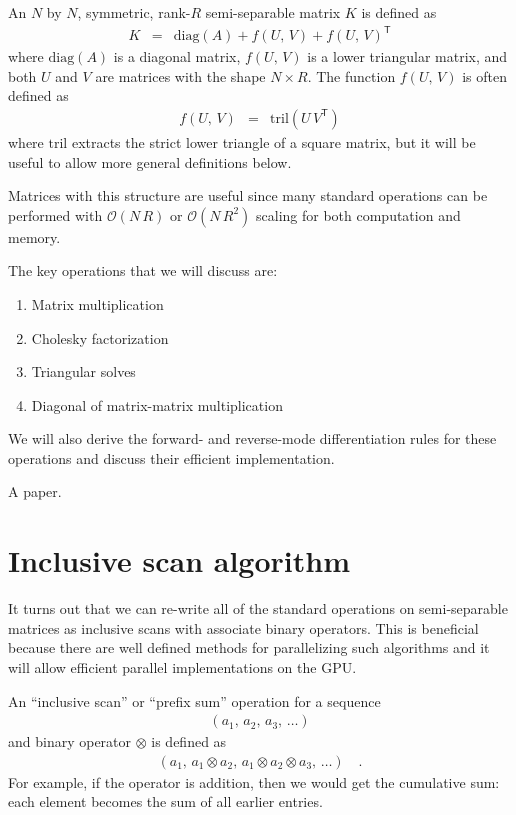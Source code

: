 \documentclass[10pt]{article}
\newcommand{\T}{^{\!\mathsf{T}\!}}
\begin{document}
An $N$ by $N$, symmetric, rank-$R$ semi-separable matrix $K$ is defined as
\begin{eqnarray}
  K &=& \mathrm{diag}(A) + f(U,\, V) + f(U,\, V)\T
\end{eqnarray}
where $\mathrm{diag}(A)$ is a diagonal matrix, $f(U,\, V)$ is a lower triangular matrix, and both $U$ and $V$ are matrices with the shape $N \times R$.
The function $f(U,\, V)$ is often defined as
\begin{eqnarray}
  f(U,\, V) &=& \mathrm{tril}(U \, V\T)
\end{eqnarray}
where $\mathrm{tril}$ extracts the strict lower triangle of a square matrix, but it will be useful to allow more general definitions below.

Matrices with this structure are useful since many standard operations can be performed with $\mathcal{O}(N\,R)$ or $\mathcal{O}(N\,R^2)$ scaling for both computation and memory.

The key operations that we will discuss are:

\begin{enumerate}
  \item Matrix multiplication
  \item Cholesky factorization
  \item Triangular solves
  \item Diagonal of matrix-matrix multiplication
\end{enumerate}

We will also derive the forward- and reverse-mode differentiation rules for these operations and discuss their efficient implementation.

A paper. \citep{foreman-mackey2017,foreman-mackey2018,gordon2020}

\citep{loper2020,hu2020}

\section{Inclusive scan algorithm}

It turns out that we can re-write all of the standard operations on semi-separable matrices as inclusive scans with associate binary operators.
This is beneficial because there are well defined methods for parallelizing such algorithms and it will allow efficient parallel implementations on the GPU.

An ``inclusive scan'' or ``prefix sum'' operation for a sequence
\begin{eqnarray}
  (a_1,\, a_2,\, a_3,\, \ldots)
\end{eqnarray}
and binary operator $\otimes$ is defined as
\begin{eqnarray}
  (a_1,\, a_1 \otimes a_2,\, a_1 \otimes a_2 \otimes a_3,\, \ldots)\quad.
\end{eqnarray}
For example, if the operator is addition, then we would get the cumulative sum: each element becomes the sum of all earlier entries.
\end{document}
